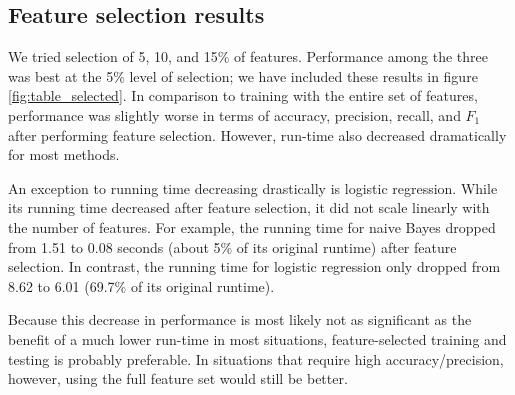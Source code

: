 \documentclass{article} %
\begin{document}
\subsection{Feature selection results}
We tried selection of 5, 10, and 15\% of features. Performance among the three was best at the 5\% level of selection; we have included these results in figure \ref{fig:table_selected}. In comparison to training with the entire set of features, performance was slightly worse in terms of accuracy, precision, recall, and $F_1$ after performing feature selection. However, run-time also decreased dramatically for most methods.  

An exception to running time decreasing drastically is logistic regression. While its running time decreased after feature selection, it did not scale linearly with the number of features. For example, the running time for naive Bayes dropped from 1.51 to 0.08 seconds (about 5\% of its original runtime) after feature selection. In contrast, the running time for logistic regression only dropped from 8.62 to 6.01 (69.7\% of its original runtime). 

Because this decrease in performance is most likely not as significant as the benefit of a much lower run-time in most situations, feature-selected training and testing is probably preferable. In situations that require high accuracy/precision, however, using the full feature set would still be better. 
\end{document}
